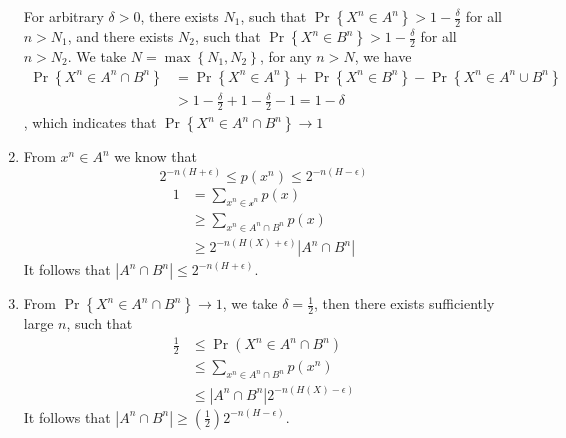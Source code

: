 \begin{exercise}[AEP]
\begin{solution}
\begin{enumerate}
{      For arbitrary $\delta > 0$, there exists $N_1$, such that  $\Pr \left\{X^n \in A^n \right\} > 1 - \frac{\delta}{2}$ for all $n>N_1$, and there exists $N_2$, such that  $\Pr \left\{X^n \in B^n \right\} > 1 - \frac{\delta}{2}$ for all $n>N_2$.
      We take $N = \max \left\{N_1,N_2\right\}$, for any $n>N$, we have
      \begin{equation}
        \begin{aligned}
          \Pr \left\{X^{n} \in A^{n} \cap B^{n}\right\} &= \Pr \left\{X^n \in A^n \right\} +  \Pr \left\{X^n \in B^n \right\} - \Pr \left\{X^n \in A^n \cup B^n \right\}\\
          & > 1 - \frac{\delta}{2} + 1 - \frac{\delta}{2} - 1 = 1 - \delta
        \end{aligned}
      \end{equation}
      , which indicates that $\Pr \left\{X^{n} \in A^{n} \cap B^{n}\right\} \rightarrow 1$
    }
    \item {
      From $x^n\in A^n$ we know that
      \begin{equation}
        2^{-n(H+\epsilon)} \le p(x^n) \le 2^{-n(H-\epsilon)}
      \end{equation}
      \begin{equation}
        \begin{aligned}
          1 &= \sum_{x^n\in \mathcal{x}^n} p(x) \\
          &\ge \sum_{x^n\in A^n \cap B^n} p(x) \\
          &\ge 2^{-n(H(X)+\epsilon)} |A^n\cap B^n|
        \end{aligned}
      \end{equation}
      It follows that $\left|A^{n} \cap B^{n}\right| \leq 2^{-n(H+\epsilon)}$.
    }
    \item {
      From $\Pr \left\{X^n \in A^n \cap B^n \right\} \rightarrow 1$, we take $\delta = \frac{1}{2}$, then there exists sufficiently large $n$, such that
      \begin{equation}
        \begin{aligned}
          \frac{1}{2} &\le \Pr (X^n \in A^n \cap B^n) \\
          &\le \sum_{x^n \in A^n \cap B^n} p(x^n) \\
          &\le |A^n\cap B^n| 2^{-n(H(X)-\epsilon)}
        \end{aligned}
      \end{equation}
      It follows that $\left|A^{n} \cap B^{n}\right| \geq \left( \frac{1}{2}\right) 2^{-n(H-\epsilon)}$.
    }
  \end{enumerate}
  \end{solution}
  \label{ex7}
\end{exercise}

